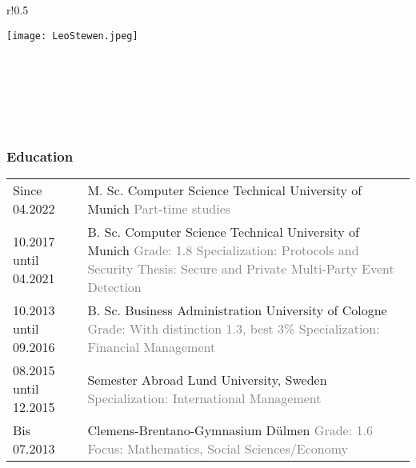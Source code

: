\begin{wrapfigure}{r!}{0.5\textwidth}
  \begin{flushright}
    \texttt{[image: LeoStewen.jpeg]}
  \end{flushright}\label{img:passphoto}
\end{wrapfigure}

\subsection*{\name{} \surname{}}
\textcolor{gray}{
  \street{}\\
  \zip{} \city{}\\
  \birthday{}\\
  \email{}\\
  \phone{}
  \bigskip
  \bigskip
  \bigskip
  \bigskip
  \bigskip
  \bigskip
}

\subsubsection*{Education}
\begin{table}[h]
\begin{tabularx}{\textwidth}{@{}p{4cm}X}

  Since 04.2022 &
  M. Sc. Computer Science \textbar{} Technical University of Munich
  \textcolor{gray}{
    \newline Part-time studies} \\

  10.2017 until 04.2021 &
  B. Sc. Computer Science \textbar{} Technical University of Munich
  \textcolor{gray}{
    \newline Grade: 1.8
    \newline Specialization: Protocols and Security
    \newline Thesis: Secure and Private Multi-Party Event Detection} \\

  10.2013 until 09.2016 &
  B. Sc. Business Administration \textbar{} University of Cologne
  \textcolor{gray}{
    \newline Grade: With distinction 1.3, best 3\%
    \newline Specialization: Financial Management} \\

  08.2015 until 12.2015 &
  Semester Abroad \textbar{} Lund University, Sweden
  \textcolor{gray}{
    \newline Specialization: International Management} \\

  Bis 07.2013         &
  Clemens-Brentano-Gymnasium \textbar{} Dülmen
  \textcolor{gray}{
    \newline Grade: 1.6
    \newline Focus: Mathematics, Social Sciences/Economy} \\

\end{tabularx}\label{tab:education}
\end{table}

